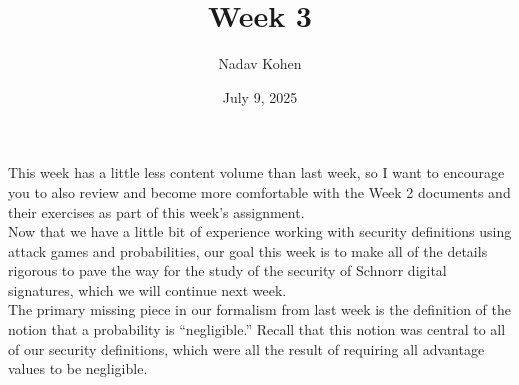 \documentclass[12pt]{article}
\theoremstyle{definition}
\theoremstyle{remark}
\theoremstyle{definition}
\begin{document}
\title{Week 3}
\author{Nadav Kohen}
\date{July 9, 2025}
\maketitle

This week has a little less content volume than last week, so I want to encourage you to also review and become more comfortable with the Week 2 documents and their exercises as part of this week's assignment.\\

Now that we have a little bit of experience working with security definitions using attack games and probabilities, our goal this week is to make all of the details rigorous to pave the way for the study of the security of Schnorr digital signatures, which we will continue next week.\\

The primary missing piece in our formalism from last week is the definition of the notion that a probability is ``negligible.'' Recall that this notion was central to all of our security definitions, which were all the result of requiring all advantage values to be negligible.
\end{document}
